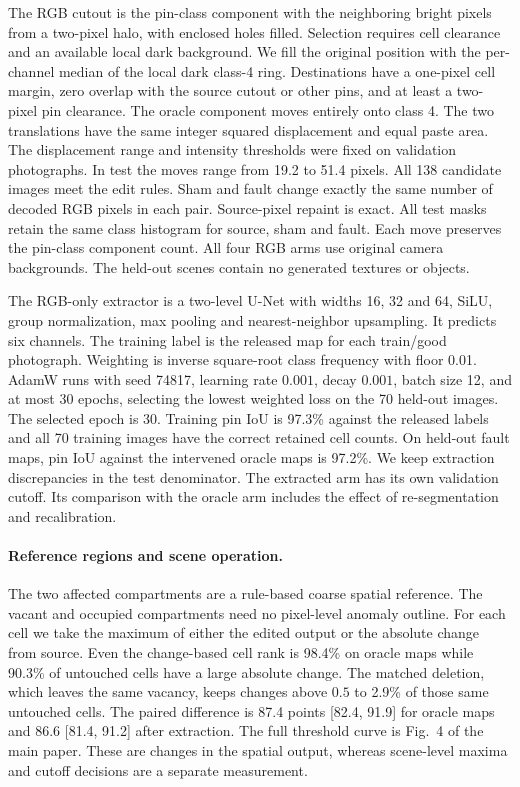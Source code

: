 The RGB cutout is the pin-class component with the neighboring bright pixels from a two-pixel halo, with enclosed holes filled. Selection requires cell clearance and an available local dark background. We fill the original position with the per-channel median of the local dark class-4 ring. Destinations have a one-pixel cell margin, zero overlap with the source cutout or other pins, and at least a two-pixel pin clearance. The oracle component moves entirely onto class 4. The two translations have the same integer squared displacement and equal paste area. The displacement range and intensity thresholds were fixed on validation photographs. In test the moves range from 19.2 to 51.4 pixels. All 138 candidate images meet the edit rules. Sham and fault change exactly the same number of decoded RGB pixels in each pair. Source-pixel repaint is exact. All test masks retain the same class histogram for source, sham and fault. Each move preserves the pin-class component count. All four RGB arms use original camera backgrounds. The held-out scenes contain no generated textures or objects.

The RGB-only extractor is a two-level U-Net with widths 16, 32 and 64, SiLU, group normalization, max pooling and nearest-neighbor upsampling. It predicts six channels. The training label is the released map for each train/good photograph. Weighting is inverse square-root class frequency with floor 0.01. AdamW runs with seed 74817, learning rate $0.001$, decay $0.001$, batch size 12, and at most 30 epochs, selecting the lowest weighted loss on the 70 held-out images. The selected epoch is 30. Training pin IoU is 97.3\% against the released labels and all 70 training images have the correct retained cell counts. On held-out fault maps, pin IoU against the intervened oracle maps is 97.2\%. We keep extraction discrepancies in the test denominator. The extracted arm has its own validation cutoff. Its comparison with the oracle arm includes the effect of re-segmentation and recalibration.


\paragraph{Reference regions and scene operation.}
The two affected compartments are a rule-based coarse spatial reference. The vacant and occupied compartments need no pixel-level anomaly outline. For each cell we take the maximum of either the edited output or the absolute change from source. Even the change-based cell rank is 98.4\% on oracle maps while 90.3\% of untouched cells have a large absolute change. The matched deletion, which leaves the same vacancy, keeps changes above $0.5$ to 2.9\% of those same untouched cells. The paired difference is 87.4 points [82.4, 91.9] for oracle maps and 86.6 [81.4, 91.2] after extraction. The full threshold curve is Fig.~4 of the main paper. These are changes in the spatial output, whereas scene-level maxima and cutoff decisions are a separate measurement.

